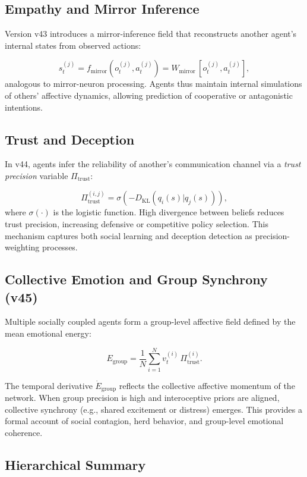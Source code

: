 \documentclass[9pt]{elife}
\begin{document}
\subsection{Empathy and Mirror Inference}

Version v43 introduces a mirror-inference field that reconstructs
another agent’s internal states from observed actions:

\[
\hat{s}^{(j)}_t = f_{\mathrm{mirror}}(o^{(j)}_t, a^{(j)}_t)
= W_{\mathrm{mirror}} \, [o^{(j)}_t, a^{(j)}_t],
\]
analogous to mirror-neuron processing.
Agents thus maintain internal simulations of others’ affective dynamics,
allowing prediction of cooperative or antagonistic intentions.

\subsection{Trust and Deception}

In v44, agents infer the reliability of another’s communication channel
via a \textit{trust precision} variable $\Pi_{\mathrm{trust}}$:

\[
\Pi_{\mathrm{trust}}^{(i,j)} =
\sigma \!\left(- D_{\mathrm{KL}}(q_i(s)|q_j(s)) \right),
\]
where $\sigma(\cdot)$ is the logistic function.
High divergence between beliefs reduces trust precision,
increasing defensive or competitive policy selection.
This mechanism captures both social learning and deception detection
as precision-weighting processes.

\subsection{Collective Emotion and Group Synchrony (v45)}

Multiple socially coupled agents form a group-level
affective field defined by the mean emotional energy:

\[
E_{\mathrm{group}} = \frac{1}{N}
\sum_{i=1}^{N} v^{(i)}_t \, \Pi_{\mathrm{trust}}^{(i)}.
\]

The temporal derivative $\dot{E}_{\mathrm{group}}$
reflects the collective affective momentum of the network.
When group precision is high and interoceptive priors are aligned,
collective synchrony (e.g., shared excitement or distress) emerges.
This provides a formal account of social contagion,
herd behavior, and group-level emotional coherence.

\subsection{Hierarchical Summary}
\end{document}
